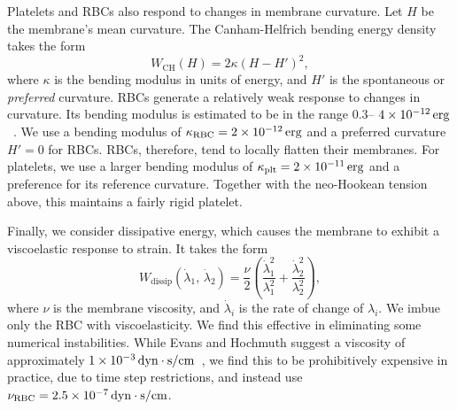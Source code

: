 Platelets and RBCs also respond to changes in membrane curvature. Let $H$ be the
membrane's mean curvature. The Canham-Helfrich bending energy density takes the form~%
\cite{Canham:1970wx}
\begin{equation}\label{eq:bending-energy}
    W_\text{CH}(H) = 2\kappa (H-H')^2,
\end{equation}
where $\kappa$ is the bending modulus in units of energy, and $H'$ is the spontaneous or
\emph{preferred} curvature.  RBCs generate a relatively weak response to changes in
curvature. Its bending modulus is estimated to be in the range $0.3$--%
$\scinot{4}{-12}\erg$~\cite{Mohandas:1994tg}. We use a bending modulus of
$\rbc\kappa = \scinot{2}{-12}\erg$ and a preferred curvature $H' = 0$ for RBCs. RBCs,
therefore, tend to locally flatten their membranes. For platelets, we use a larger
bending modulus of $\plt\kappa = \scinot{2}{-11}\erg$ and a preference for its reference
curvature. Together with the neo-Hookean tension above, this maintains a fairly rigid
platelet.

Finally, we consider dissipative energy, which causes the membrane to exhibit a
viscoelastic response to strain. It takes the form~\cite{Rangamani:2012hi}
\begin{equation}\label{eq:dissip-energy}
    W_\text{dissip}(\dot{\lambda}_1,\,\dot{\lambda}_2) = \frac{\nu}{2}\left(\frac{\dot{\lambda}_1^2}{\lambda_1^2} + \frac{\dot{\lambda}_2^2}{\lambda_2^2}\right),
\end{equation}
where $\nu$ is the membrane viscosity, and $\dot{\lambda}_i$ is the rate of change of
$\lambda_i$. We imbue only the RBC with viscoelasticity. We find this effective in
eliminating some numerical instabilities. While Evans and Hochmuth suggest a viscosity of
approximately $\scinot{1}{-3}\dynsecpercm$~\cite{Evans:1976tx}, we find this to be
prohibitively expensive in practice, due to time step restrictions, and instead use
$\rbc\nu = \scinot{2.5}{-7}\dynsecpercm$.

